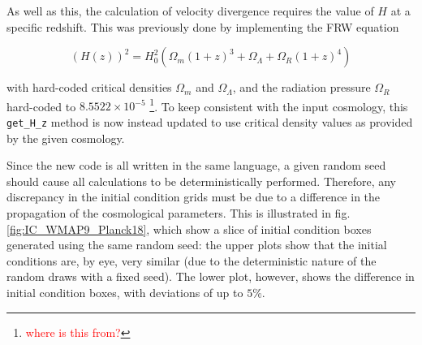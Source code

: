 \documentclass[floats,floatfix,showpacs,amssymb,prd,superscriptaddress,nofootinbib]{revtex4-2} %
\newcommand{\code}{\texttt}
\newcommand{\red}{\textcolor{red}}
\begin{document}
As well as this, the calculation of velocity divergence requires the value of $H$ at a specific redshift. This was previously done by implementing the FRW equation

\begin{equation}
    (H(z))^2 = H_0^2 (\Omega_m (1 + z)^3 + \Omega_\Lambda + \Omega_R (1+z)^4)
\end{equation}

\noindent with hard-coded critical densities $\Omega_m$ and $\Omega_\Lambda$, and the radiation pressure $\Omega_R$ hard-coded to $8.5522 \times 10^{-5}$ \footnote{\red{where is this from?}}. To keep consistent with the input cosmology, this \code{get\_H\_z} method is now instead updated to use critical density values as provided by the given cosmology.


Since the new code is all written in the same language, a given random seed should cause all calculations to be deterministically performed. Therefore, any discrepancy in the initial condition grids must be due to a difference in the propagation of the cosmological parameters. This is illustrated in fig. \ref{fig:IC_WMAP9_Planck18}, which show a slice of initial condition boxes generated using the same random seed: the upper plots show that the initial conditions are, by eye, very similar (due to the deterministic nature of the random draws with a fixed seed). The lower plot, however, shows the difference in initial condition boxes, with deviations of up to $5 \%$.
\end{document}
